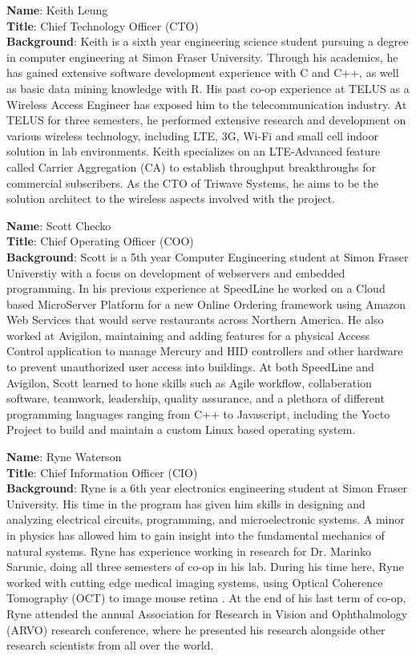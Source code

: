 \bigskip
\bigskip
\textbf{Name}:  Keith Leung\\
\medskip
\textbf{Title}: Chief Technology Officer (CTO) \\
\medskip
\textbf{Background}:
Keith is a sixth year engineering science student pursuing a degree in computer engineering at Simon Fraser University. Through his academics, he has gained extensive software development experience with C and C++, as well as basic data mining knowledge with R. His past co-op experience at TELUS as a Wireless Access Engineer has exposed him to the telecommunication industry. At TELUS for three semesters, he performed extensive research and development on various wireless technology, including LTE, 3G, Wi-Fi and small cell indoor solution in lab environments. Keith specializes on an LTE-Advanced feature called Carrier Aggregation (CA) to establish throughput breakthroughs for commercial subscribers. As the CTO of Triwave Systems, he aims to be the solution architect to the wireless aspects involved with the project.

\pagebreak
\textbf{Name}: Scott Checko\\
\medskip
\textbf{Title}: Chief Operating Officer (COO)\\
\medskip
\textbf{Background}:
Scott is a 5th year Computer Engineering student at Simon Fraser Universtiy with a focus on development of webservers and embedded programming.
In his previous experience at SpeedLine he worked on a Cloud based MicroServer Platform for a new Online Ordering framework using Amazon Web Services that would serve restaurants across Northern America.
He also worked at Avigilon, maintaining and adding features for a physical Access Control application to manage Mercury and HID controllers and other hardware to prevent unauthorized user access into buildings.
At both SpeedLine and Avigilon, Scott learned to hone skills such as Agile workflow, collaberation software, teamwork, leadership, quality assurance, and a plethora of different programming languages ranging from C++ to Javascript, including the Yocto Project to build and maintain a custom Linux based operating system.

\bigskip
\bigskip
\textbf{Name}: Ryne Waterson\\
\medskip
\textbf{Title}: Chief Information Officer (CIO)\\
\medskip
\textbf{Background}: Ryne is a 6th year electronics engineering student at Simon Fraser University. His time in the program has given him skills in designing and analyzing electrical circuits, programming, and microelectronic systems. A minor in physics has allowed him to gain insight into the fundamental mechanics of natural systems. Ryne has experience working in research for Dr. Marinko Sarunic, doing all three semesters of co-op in his lab. During his time here, Ryne worked with cutting edge medical imaging systems, using Optical Coherence Tomography (OCT) to image mouse retina . At the end of his last term of co-op, Ryne attended the annual Association for Research in Vision and Ophthalmology (ARVO) research conference, where he presented his research alongside other research scientists from all over the world.  

